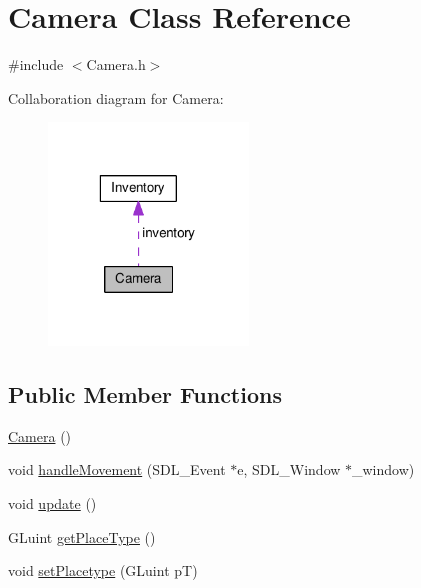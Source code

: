 \hypertarget{class_camera}{}\section{Camera Class Reference}
\label{class_camera}


{\ttfamily \#include $<$Camera.\+h$>$}



Collaboration diagram for Camera\+:\nopagebreak
\begin{figure}[H]
\begin{center}
\leavevmode
\includegraphics[width=151pt]{class_camera__coll__graph}
\end{center}
\end{figure}
\subsection*{Public Member Functions}
\begin{DoxyCompactItemize}
\item 
\hyperlink{class_camera_a01f94c3543f56ede7af49dc778f19331}{Camera} ()
\item 
void \hyperlink{class_camera_a3ab09e6714cc9b6ab58b4346b0e98011}{handle\+Movement} (S\+D\+L\+\_\+\+Event $\ast$e, S\+D\+L\+\_\+\+Window $\ast$\+\_\+window)
\item 
void \hyperlink{class_camera_a42cda7239981a5618660d04bd5893556}{update} ()
\item 
G\+Luint \hyperlink{class_camera_abab3e9c2360aa3480efc6d630e1f79e8}{get\+Place\+Type} ()
\item 
void \hyperlink{class_camera_a1f54fbe68c3810a2f4df001c671323bc}{set\+Placetype} (G\+Luint p\+T)
\end{DoxyCompactItemize}
